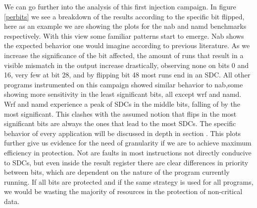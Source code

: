 \documentclass[lettersize,journal]{IEEEtran}
\begin{document}
We can go further into the analysis of this first injection campaign. In figure \ref{perbits} we see a breakdown of the results according to the specific bit flipped, here as an example we are showing the plots for the nab and namd benchmarks respectively. With this view some familiar patterns start to emerge. Nab shows the expected behavior one would imagine according to previous literature. As we increase the significance of the bit affected, the amount of runs that result in a visible mismatch in the output increase drastically, observing none on bits 0 and 16, very few at bit 28, and by flipping bit 48 most runs end in an SDC. All other programs instrumented on this campaign showed similar behavior to nab,some showing more sensitivity in the least significant bits, all except wrf and namd. Wrf and namd experience a peak of SDCs in the middle bits, falling of by the most significant. This clashes with the assumed notion that flips in the most significant bits are always the ones that lead to the most SDCs. The specific behavior of every application will be discussed in depth in section  . This plots further give us evidence for the need of granularity if we are to achieve maximum efficiency in protection. Not are faults in most instructions not directly conducive to SDCs, but even inside the result register there are clear differences in priority between bits, which are dependent on the nature of the program currently running. If all bits are protected and if the same strategy is used for all programs, we would be wasting the majority of resources in the protection of non-critical data.\\
\end{document}
